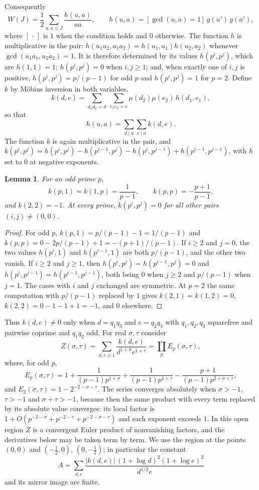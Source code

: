 \documentclass{amsart}
\newtheorem{lemma}[theorem]{Lemma}
\theoremstyle{definition}
\theoremstyle{remark}
\numberwithin{equation}{section}
\begin{document}
Consequently
\begin{equation}\label{eq:Wh}
W(J)=\frac12\sum_{u,a\le J}\frac{h(u,a)}{ua},\qquad h(u,a)=[\gcd(u,a)=1]\,g(u')\,g(a'),
\end{equation}
where $[\,\cdot\,]$ is $1$ when the condition holds and $0$ otherwise. The function $h$ is multiplicative in the pair: $h(u_1u_2,a_1a_2)=h(u_1,a_1)h(u_2,a_2)$ whenever $\gcd(u_1a_1,u_2a_2)=1$. It is therefore determined by its values $h(p^i,p^j)$, which are
$h(1,1)=1$; $h(p^i,p^j)=0$ when $i,j\ge1$; and, when exactly one of $i,j$ is positive, $h(p^i,p^j)=p/(p-1)$ for odd $p$ and $h(p^i,p^j)=1$ for $p=2$.
Define $k$ by M\"obius inversion in both variables,
\[
k(d,e)=\sum_{d_1d_2=d}\ \sum_{e_1e_2=e}\mu(d_2)\mu(e_2)\,h(d_1,e_1),
\]
so that
\[
h(u,a)=\sum_{d\mid u}\sum_{e\mid a}k(d,e).
\]
The function $k$ is again multiplicative in the pair, and $k(p^i,p^j)=h(p^i,p^j)-h(p^{i-1},p^j)-h(p^i,p^{j-1})+h(p^{i-1},p^{j-1})$, with $h$ set to $0$ at negative exponents.

\begin{lemma}\label{lem:k}
For an odd prime $p$,
\[
k(p,1)=k(1,p)=\frac1{p-1},\qquad k(p,p)=-\frac{p+1}{p-1},
\]
and $k(2,2)=-1$. At every prime, $k(p^i,p^j)=0$ for all other pairs $(i,j)\ne(0,0)$.
\end{lemma}

\begin{proof}
For odd $p$, $k(p,1)=p/(p-1)-1=1/(p-1)$ and $k(p,p)=0-2p/(p-1)+1=-(p+1)/(p-1)$. If $i\ge2$ and $j=0$, the two values $h(p^i,1)$ and $h(p^{i-1},1)$ are both $p/(p-1)$, and the other two vanish. If $i\ge2$ and $j\ge1$, then $h(p^i,p^j)=h(p^{i-1},p^j)=0$ and $h(p^i,p^{j-1})=h(p^{i-1},p^{j-1})$, both being $0$ when $j\ge2$ and $p/(p-1)$ when $j=1$. The cases with $i$ and $j$ exchanged are symmetric. At $p=2$ the same computation with $p/(p-1)$ replaced by $1$ gives $k(2,1)=k(1,2)=0$, $k(2,2)=0-1-1+1=-1$, and $0$ elsewhere.
\end{proof}

Thus $k(d,e)\ne0$ only when $d=q_1q_3$ and $e=q_2q_3$ with $q_1,q_2,q_3$ squarefree and pairwise coprime and $q_1q_2$ odd. For real $\sigma,\tau$ consider
\[
Z(\sigma,\tau)=\sum_{d,e\ge1}\frac{k(d,e)}{d^{1+\sigma}e^{1+\tau}}=\prod_pE_p(\sigma,\tau),
\]
where, for odd $p$,
\[
E_p(\sigma,\tau)=1+\frac1{(p-1)p^{1+\sigma}}+\frac1{(p-1)p^{1+\tau}}-\frac{p+1}{(p-1)p^{2+\sigma+\tau}},
\]
and $E_2(\sigma,\tau)=1-2^{-2-\sigma-\tau}$.
The series converges absolutely when $\sigma>-1$, $\tau>-1$ and $\sigma+\tau>-1$, because then the same product with every term replaced by its absolute value converges: its local factor is $1+O(p^{-2-\sigma}+p^{-2-\tau}+p^{-2-\sigma-\tau})$ and each exponent exceeds $1$. In this open region $Z$ is a convergent Euler product of nonvanishing factors, and the derivatives below may be taken term by term. We use the region at the points $(0,0)$ and $(-\tfrac12,0)$, $(0,-\tfrac12)$; in particular the constant
\[
A=\sum_{d,e}\frac{|k(d,e)|\,(1+\log d)^2(1+\log e)^2}{d^{1/2}e}
\]
and its mirror image are finite.
\end{document}
